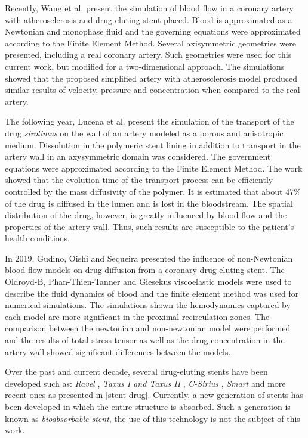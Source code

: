 \medskip
Recently, Wang et al. \cite{wang2017} present the simulation
 of blood flow in a coronary artery with atherosclerosis and
 drug-eluting stent placed. Blood is approximated as a Newtonian and
 monophase fluid and the governing equations were approximated
 according to the Finite Element Method. Several axisymmetric
 geometries were presented, including a real coronary artery.
 Such geometries were used for this current work, but modified
 for a two-dimensional approach. The simulations showed that
 the proposed simplified artery with atherosclerosis model
 produced similar results of velocity, pressure and concentration
 when compared to the real artery.

\medskip
The following year, Lucena et al. \cite{lucena2018} present 
the simulation of the transport of the drug \textit{sirolimus}
 on the wall of an artery modeled as a porous and anisotropic medium.
 Dissolution in the polymeric stent lining in addition to transport
 in the artery wall in an axysymmetric domain was considered.
 The government equations were approximated according to
 the Finite Element Method. The work showed that the evolution time
 of the transport process can be efficiently controlled by
 the mass diffusivity of the polymer. It is estimated that
 about 47\% of the drug is diffused in the lumen and is lost in
 the bloodstream. The spatial distribution of the drug, however,
 is greatly influenced by blood flow and the properties of 
the artery wall. Thus, such results are susceptible to the
 patient's health conditions.

\medskip
In 2019, Gudino, Oishi and Sequeira \cite{gudino2019} presented
the influence of non-Newtonian blood flow models on drug
diffusion from a coronary drug-eluting stent. 
The Oldroyd-B, Phan-Thien-Tanner and Giesekus viscoelastic models
were used to describe the fluid dynamics of blood and the finite
element method was used for numerical simulations. The simulations
shown the hemodynamics captured by each model are more significant
in the proximal recirculation zones. The comparison between the
newtonian and non-newtonian model were performed and
the results of total stress tensor as well as the drug concentration in the artery
wall showed significant differences between the models. 


\medskip
Over the past and current decade, several drug-eluting stents
 have been developed such as: \textit{Ravel} \cite{morice2002},
 \textit{Taxus I and Taxus II} \cite{grube2003} \cite{colombo2003},
 \textit{C-Sirius} \cite{schampaert2004},
 \textit{Smart} \cite{ardissino2004} and
 more recent ones as presented in \ref{stent drug}. 
Currently, a new generation of stents has been developed
 in which the entire structure is absorbed. 
Such a generation is known as \textit{bioabsorbable stent}, 
the use of this technology is not the subject of this work.


